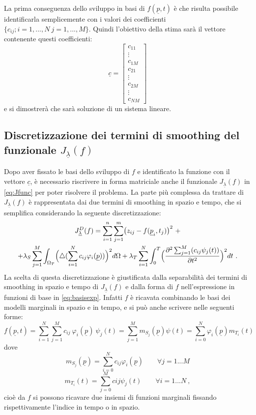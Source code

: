 \documentclass[a4paper,11pt,twoside,openright]{book}							%
\begin{document}
La prima conseguenza dello sviluppo in basi di $f(\underline p,t)$ è che risulta possibile identificarla semplicemente con i valori dei coefficienti $\{c_{ij}; i=1, ... , N\ j=1, ... , M\}$. Quindi l'obiettivo della stima sarà il vettore contenente questi coefficienti:
\begin{equation}
\underline c =
\begin{bmatrix}
c_{11}  \\
\vdots\\
c_{1M}  \\
c_{21}  \\
\vdots\\
c_{2M}  \\
\vdots\\
c_{NM}
\end{bmatrix}
\end{equation}
e si dimostrerà che sarà soluzione di un sistema lineare.

\subsection*{Discretizzazione dei termini di smoothing del funzionale $J_{\underline \lambda }(f)$}
Dopo aver fissato le basi dello sviluppo di $f$ e identificato la funzione con il vettore $\underline c$, è necessario riscrivere in forma matriciale anche il funzionale $J_{\underline \lambda }(f)$ in \ref{eq:Jfunc} per poter risolvere il problema. La parte più complessa da trattare di $J_{\underline \lambda }(f)$ è rappresentata dai due termini di smoothing in spazio e tempo, che si semplifica considerando la seguente discretizzazione:
\begin{multline}
\label{eq:penalizzdisc}
J_{\underline \lambda }^D(f)=\sum_{i=1}^n \sum_{j=1}^m \bigl( z_{ij} - f(\underline p_i,t_j) \bigr)^2 \ + \\
+\lambda_S  \sum_{j=1}^M \int_{\Omega_T} \Bigl( \triangle(\sum_{i=1}^N  c_{ij}\varphi_i (\underline p)) \Bigr)^2 d \Omega + \lambda_T \sum_{i=1}^N\int_0^T \Bigl( \frac{\partial^2 \sum_{j=1}^M(c_{ij}\psi_j(t)) }{\partial t ^2} \Bigr)^2 dt \ .
\end{multline}
La scelta di questa discretizzazione è giustificata dalla separabilità dei termini di smoothing in spazio e tempo di $J_{\underline \lambda }(f)$ e dalla forma di $f$ nell'espressione in funzioni di base in \ref{eq:basisexp}. Infatti $f$ è ricavata combinando le basi dei modelli marginali in spazio e in tempo, e si può anche scrivere nelle seguenti forme:
$$
f(\underline p,t)=\sum_{i=1}^N \sum_{j=1}^M c_{ij}\ \varphi_i(\underline p)\ \psi_j(t)=\sum_{j=1}^Mm_{S_j}(\underline p)\psi(t)=\sum_{i=0}^N\varphi_i(\underline p)m_{T_i}(t)
$$
dove
$$
m_{S_j}(\underline p)=\sum_{i=0}^Nc_{ij}\varphi_i(\underline p) \qquad \forall j=1...M
$$
$$
m_{T_i}(t)=\sum_{j=0}^Mc{ij}\psi_j(t) \qquad \forall i=1...N \ ,
$$
cioè da $f$ si possono ricavare due insiemi di funzioni marginali fissando rispettivamente l'indice in tempo o in spazio.
\end{document}
